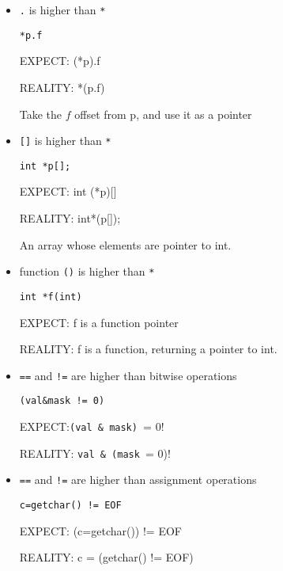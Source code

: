 \begin{itemize}
   \item \verb!.! is higher than \verb!*!
\begin{verbatim}
*p.f
\end{verbatim}
\begin{minipage}[t]{0.5\textwidth}
EXPECT: (*p).f
\end{minipage} 
\begin{minipage}[t]{0.5\textwidth}
REALITY: *(p.f)

Take the $f$ offset from p, and use it as a pointer
\end{minipage} 
  
  \item \verb![]! is higher than \verb!*!
\begin{verbatim}
int *p[];
\end{verbatim}
\begin{minipage}[t]{0.5\textwidth}
EXPECT: int (*p)[]
\end{minipage} 
\begin{minipage}[t]{0.5\textwidth}
REALITY: int*(p[]);

An array whose elements are pointer to int.
\end{minipage} 


  \item function \verb!()! is higher than \verb!*!
\begin{verbatim}
int *f(int)
\end{verbatim}
\begin{minipage}[t]{0.5\textwidth}
EXPECT: f is a function pointer
\end{minipage} 
\begin{minipage}[t]{0.5\textwidth}
REALITY: f is a function, returning a pointer to int.
\end{minipage} 
   
   \item \verb!==! and \verb.!=. are higher than bitwise operations
\begin{verbatim}
(val&mask != 0)
\end{verbatim}

\begin{minipage}[t]{0.5\textwidth}
EXPECT:\verb!(val & mask) != 0!
\end{minipage} 
\begin{minipage}[t]{0.5\textwidth}
REALITY: \verb!val & (mask != 0)!
\end{minipage} 

   \item \verb!==! and \verb.!=. are higher than assignment operations
\begin{verbatim}
c=getchar() != EOF
\end{verbatim}
\begin{minipage}[t]{0.5\textwidth}
EXPECT: (c=getchar()) != EOF
\end{minipage} 
\begin{minipage}[t]{0.5\textwidth}
REALITY: c = (getchar() != EOF)
\end{minipage} 


\end{itemize}
